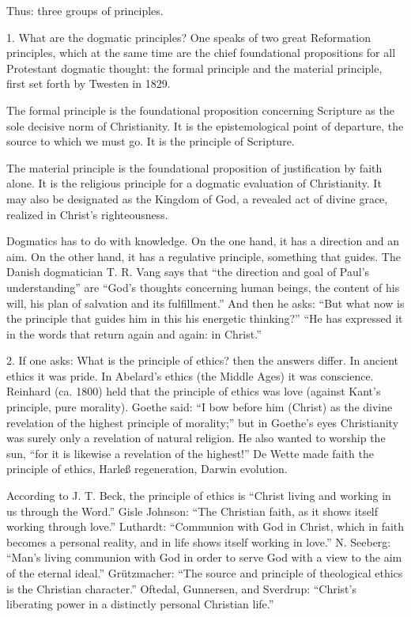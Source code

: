 Thus: three groups of principles.

1. What are the dogmatic principles?
   One speaks of two great Reformation principles, which at the same time are the chief foundational propositions for all Protestant dogmatic thought: the formal principle and the material principle, first set forth by Twesten in 1829.

The formal principle is the foundational proposition concerning Scripture as the sole decisive norm of Christianity. It is the epistemological point of departure, the source to which we must go. It is the principle of Scripture.

The material principle is the foundational proposition of justification by faith alone. It is the religious principle for a dogmatic evaluation of Christianity. It may also be designated as the Kingdom of God, a revealed act of divine grace, realized in Christ’s righteousness.

Dogmatics has to do with knowledge. On the one hand, it has a direction and an aim. On the other hand, it has a regulative principle, something that guides. The Danish dogmatician T. R. Vang says that “the direction and goal of Paul’s understanding” are “God’s thoughts concerning human beings, the content of his will, his plan of salvation and its fulfillment.” And then he asks: “But what now is the principle that guides him in this his energetic thinking?” “He has expressed it in the words that return again and again: in Christ.”

2. If one asks: What is the principle of ethics? then the answers differ. In ancient ethics it was pride. In Abelard’s ethics (the Middle Ages) it was conscience. Reinhard (ca. 1800) held that the principle of ethics was love (against Kant’s principle, pure morality). Goethe said: “I bow before him (Christ) as the divine revelation of the highest principle of morality;” but in Goethe’s eyes Christianity was surely only a revelation of natural religion. He also wanted to worship the sun, “for it is likewise a revelation of the highest!” De Wette made faith the principle of ethics, Harleß regeneration, Darwin evolution.

According to J. T. Beck, the principle of ethics is “Christ living and working in us through the Word.” Gisle Johnson: “The Christian faith, as it shows itself working through love.” Luthardt: “Communion with God in Christ, which in faith becomes a personal reality, and in life shows itself working in love.” N. Seeberg: “Man’s living communion with God in order to serve God with a view to the aim of the eternal ideal.” Grützmacher: “The source and principle of theological ethics is the Christian character.” Oftedal, Gunnersen, and Sverdrup: “Christ’s liberating power in a distinctly personal Christian life.”

